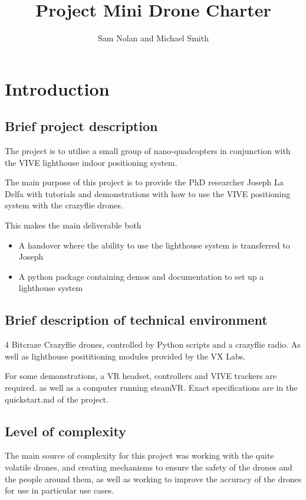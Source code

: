 \documentclass{article}
\author{Sam Nolan and Michael Smith}
\title{Project Mini Drone Charter}
\begin{document}
  \maketitle

  \section{Introduction}
  \subsection{Brief project description}
  The project is to utilise a small group of nano-quadcopters in conjunction with the VIVE lighthouse indoor positioning system. 
  
  The main purpose of this project is to provide the PhD researcher Joseph La Delfa
  with tutorials and demonstrations with how to use the VIVE positioning system
  with the crazyflie drones.

  This makes the main deliverable both
  \begin{itemize}
      \item A handover where the ability to use the lighthouse system is transferred to Joseph
      \item A python package containing demos and documentation to set up a lighthouse system
  \end{itemize}

  \subsection{Brief description of technical environment}
  4 Bitcraze Crazyflie drones, controlled by Python scripts and a crazyflie radio.
  As well as lighthouse posititioning modules provided by the VX Labs.

  For some demonstrations, a VR headset, controllers and VIVE trackers are required.
  as well as a computer running steamVR. Exact specifications are in the quickstart.md
  of the project.

  \subsection{Level of complexity}
  The main source of complexity for this project was working with the quite volatile
  drones, and creating mechanisms to ensure the safety of the drones and the people
  around them, as well as working to improve the accuracy of the drones for use
  in particular use cases.
\end{document}
